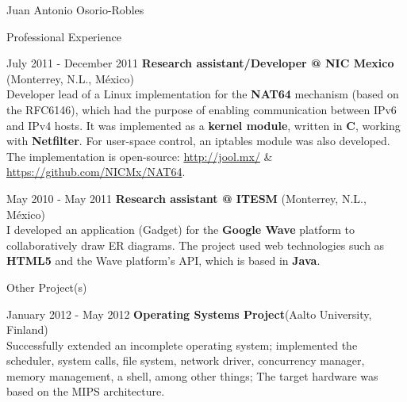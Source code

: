 \documentclass[english,10pt,letterpaper]{article}
\begin{document}
\begin{cv}{Juan Antonio Osorio-Robles}
\begin{cvlist}{Professional Experience}
		\item [July 2011 - December 2011]
            \textbf{Research assistant/Developer @ NIC Mexico} (Monterrey,
            N.L., M\'{e}xico)\\
            Developer lead of a Linux implementation for the \textbf{NAT64}
            mechanism (based on the RFC6146), which had the purpose of
            enabling communication between IPv6 and IPv4 hosts. It was
            implemented as a \textbf{kernel module}, written in \textbf{C},
            working with \textbf{Netfilter}. For user-space control, an
            iptables module was also developed. The implementation is
            open-source:
            \href{http://jool.mx/}{http://jool.mx/} \&\\
            \href{https://github.com/NICMx/NAT64}{https://github.com/NICMx/NAT64}.

		\item [May 2010 - May 2011]
            \textbf{Research assistant @ ITESM} (Monterrey, N.L., M\'{e}xico)\\
            I developed an application (Gadget) for the \textbf{Google Wave}
            platform to collaboratively draw ER diagrams. The project used web
            technologies such as \textbf{HTML5} and the Wave platform's API,
            which is based in \textbf{Java}.

	\end{cvlist}

    \begin{cvlist}{Other Project(s)}
		\item [January 2012 - May 2012]
            \textbf{Operating Systems Project}(Aalto University, Finland)\\
            Successfully extended an incomplete operating system; implemented
            the scheduler, system calls, file system, network driver,
            concurrency manager, memory management, a shell, among other
            things; The target hardware was based on the MIPS architecture.
	\end{cvlist}


\end{cv}
\end{document}
